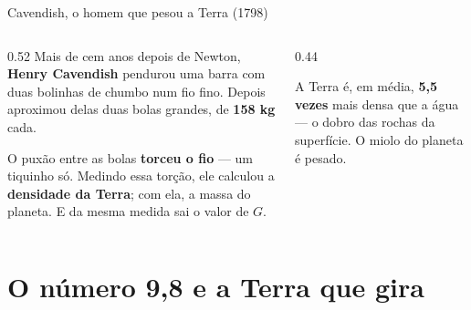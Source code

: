 \documentclass[aspectratio=169,11pt]{beamer}
\newcommand{\bnum}[1]{\textbf{\textcolor{mTeal}{#1}}}
\begin{document}
\begin{frame}{Cavendish, o homem que pesou a Terra (1798)}
  \begin{columns}[T]
    \begin{column}{0.52\textwidth}
      Mais de cem anos depois de Newton, \textbf{Henry Cavendish} pendurou uma barra com duas
      bolinhas de chumbo num fio fino. Depois aproximou delas duas bolas grandes, de
      \bnum{158 kg} cada.
      \medskip

      O puxão entre as bolas \bnum{torceu o fio} --- um tiquinho só. Medindo essa torção,
      ele calculou a \bnum{densidade da Terra}; com ela, a massa do planeta. E da mesma
      medida sai o valor de $G$.
    \end{column}
    \begin{column}{0.44\textwidth}
      \centering
      \medskip
      \begin{cuidado}[title={A surpresa}]
        \small A Terra é, em média, \bnum{5,5 vezes} mais densa que a água --- o dobro das
        rochas da superfície. O miolo do planeta é pesado.
      \end{cuidado}
    \end{column}
  \end{columns}
\end{frame}

\section{O número 9,8 e a Terra que gira}
\end{document}
